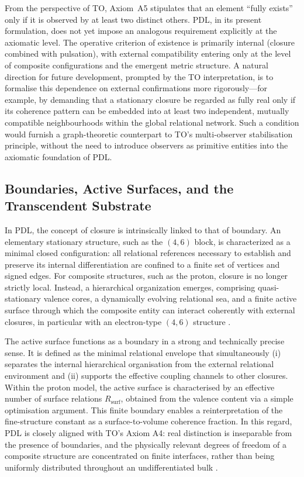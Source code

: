 \documentclass[11pt,a4paper]{article}
\begin{document}
From the perspective of TO, Axiom~A5 stipulates that an element “fully exists” only if it is observed by at least two distinct others. PDL, in its present formulation, does not yet impose an analogous requirement explicitly at the axiomatic level. The operative criterion of existence is primarily internal (closure combined with pulsation), with external compatibility entering only at the level of composite configurations and the emergent metric structure. A natural direction for future development, prompted by the TO interpretation, is to formalise this dependence on external confirmations more rigorously—for example, by demanding that a stationary closure be regarded as fully real only if its coherence pattern can be embedded into at least two independent, mutually compatible neighbourhoods within the global relational network. Such a condition would furnish a graph-theoretic counterpart to TO’s multi-observer stabilisation principle, without the need to introduce observers as primitive entities into the axiomatic foundation of PDL.

\subsection{Boundaries, Active Surfaces, and the Transcendent Substrate}

In PDL, the concept of closure is intrinsically linked to that of boundary. An elementary stationary structure, such as the \((4,6)\) block, is characterized as a minimal closed configuration: all relational references necessary to establish and preserve its internal differentiation are confined to a finite set of vertices and signed edges. For composite structures, such as the proton, closure is no longer strictly local. Instead, a hierarchical organization emerges, comprising quasi-stationary valence cores, a dynamically evolving relational sea, and a finite active surface through which the composite entity can interact coherently with external closures, in particular with an electron-type \((4,6)\) structure \cite{Laubscher_PDL_IMRad,Laubscher_LDP_fr}.

The active surface functions as a boundary in a strong and technically precise sense. It is defined as the minimal relational envelope that simultaneously (i) separates the internal hierarchical organisation from the external relational environment and (ii) supports the effective coupling channels to other closures. Within the proton model, the active surface is characterised by an effective number of surface relations \(R_{\text{surf}}\), obtained from the valence content via a simple optimisation argument. This finite boundary enables a reinterpretation of the fine-structure constant as a surface-to-volume coherence fraction. In this regard, PDL is closely aligned with TO’s Axiom A4: real distinction is inseparable from the presence of boundaries, and the physically relevant degrees of freedom of a composite structure are concentrated on finite interfaces, rather than being uniformly distributed throughout an undifferentiated bulk \cite{Laubscher_PDL_long}.  
\end{document}
